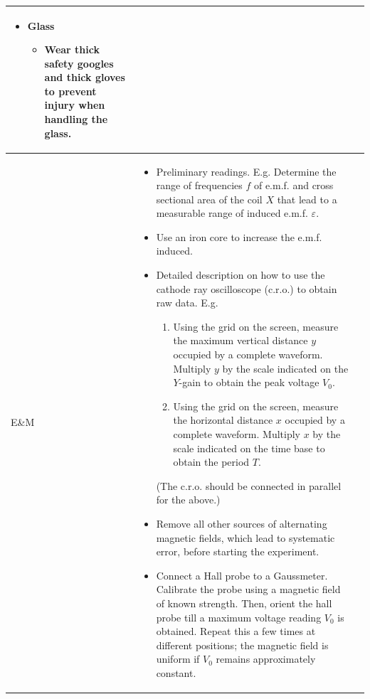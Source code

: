 \documentclass[oneside]{book}
\begin{document}
\begin{longtable}{M{0.1\textwidth}m{0.4\textwidth}m{0.4\textwidth}}
\begin{itemize}
\begin{itemize}
        \end{itemize}
        \item Glass
        \begin{itemize}
            \item[\textcolor{green!70!black}{\checkmark}] Wear thick safety googles and thick gloves to prevent injury when handling the glass.
        \end{itemize}
    \end{itemize}
    \tabularnewline\midrule
    \newpage\midrule
    E\&M &
    \begin{itemize}
        \item[\textcolor{green!70!black}{\checkmark}] Preliminary readings. E.g. Determine the range of frequencies \(f\) of e.m.f. and cross sectional area of the coil \(X\) that lead to a measurable range of induced e.m.f. \(\varepsilon\).
        \item[\textcolor{green!70!black}{\checkmark}] Use an iron core to increase the e.m.f. induced.
        \item[\textcolor{green!70!black}{\checkmark}] Detailed description on how to use the cathode ray oscilloscope (c.r.o.) to obtain raw data. E.g. 
        \begin{enumerate}
            \item Using the grid on the screen, measure the maximum vertical distance \(y\) occupied by a complete waveform. Multiply \(y\) by the scale indicated on the \(Y\)-gain to obtain the peak voltage \(V_0\).
            \item Using the grid on the screen, measure the horizontal distance \(x\) occupied by a complete waveform. Multiply \(x\) by the scale indicated on the time base to obtain the period \(T\).
        \end{enumerate}
        (The c.r.o. should be connected in parallel for the above.)
        \item[\textcolor{green!70!black}{\checkmark}] \hypertarget{error:other-sources-of-alternating-magnetic-fields}{Remove all other sources of alternating magnetic fields, which lead to systematic error, before starting the experiment.}
        \item[\textcolor{green!70!black}{\checkmark}] Connect a Hall probe to a Gaussmeter. Calibrate the probe using a magnetic field of known strength. Then, orient the hall probe till a maximum voltage reading \(V_0\) is obtained. Repeat this a few times at different positions; the magnetic field is uniform if \(V_0\) remains approximately constant. 

\end{itemize}
\end{longtable}
\end{document}
